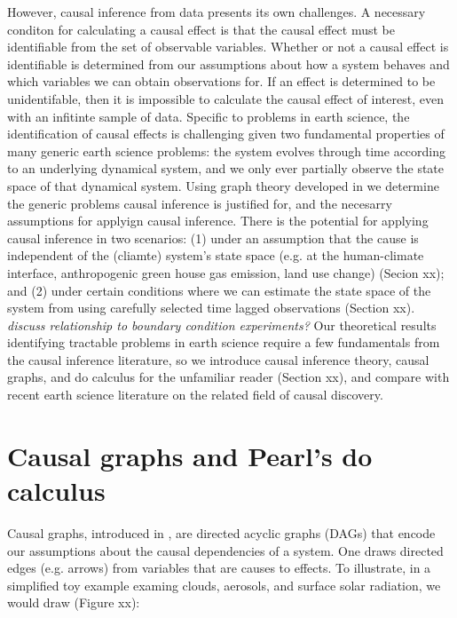 \documentclass[12pt]{article}
\begin{document}
However, causal inference from data presents its own challenges. A
necessary conditon for calculating a causal effect is that the
causal effect must be identifiable from the set of observable
variables. Whether or not a causal effect is identifiable is
determined from our assumptions about how a system behaves and
which variables we can obtain observations for. If an effect is
determined to be unidentifable, then it is impossible to calculate
the causal effect of interest, even with an infitinte sample of
data. Specific to problems in earth science, the identification of
causal effects is challenging given two fundamental properties of
many generic earth science problems: the system evolves through
time according to an underlying dynamical system, and we only ever
partially observe the state space of that dynamical system. Using
graph theory developed in \citep{pearl-1995} we determine the
generic problems causal inference is justified for, and the
necesarry assumptions for applyign causal inference. There is the
potential for applying causal inference in two scenarios: (1)
under an assumption that the cause is independent of the (cliamte)
system's state space (e.g. at the human-climate interface,
anthropogenic green house gas emission, land use change) (Secion
xx); and (2) under certain conditions where we can estimate the
state space of the system from using carefully selected time
lagged observations (Section xx).  \emph{discuss relationship to
boundary condition experiments?} Our theoretical results
identifying tractable problems in earth science require a few
fundamentals from the causal inference literature, so we introduce
causal inference theory, causal graphs, and do calculus for the
unfamiliar reader (Section xx), and compare with recent earth
science literature on the related field of causal discovery.


\section{Causal graphs and Pearl's do calculus}


Causal graphs, introduced in \citep{pearl-1995}, are directed
acyclic graphs (DAGs) that encode our assumptions about the causal
dependencies of a system. One draws directed edges (e.g. arrows)
from variables that are causes to effects. To illustrate, in a
simplified toy example examing clouds, aerosols, and surface solar
radiation, we would draw (Figure xx):
\end{document}
